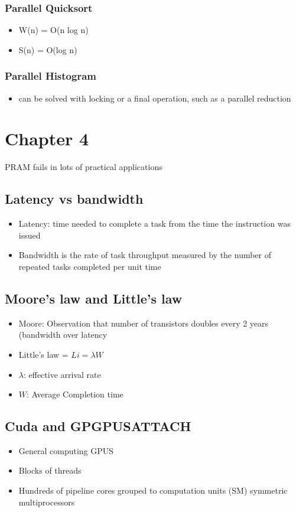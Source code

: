 \documentclass{assignments}
\begin{document}
\subsubsection*{Parallel Quicksort}
\label{sec:org1a65a16}
\begin{itemize}
\item W(n) = O(n log n)
\item S(n) = O(log n)
\end{itemize}
\subsubsection*{Parallel Histogram}
\label{sec:orgea368e5}
\begin{itemize}
\item can be solved with locking or a final operation, such as a parallel reduction
\end{itemize}
\section*{Chapter 4}
\label{sec:orgd202857}
PRAM fails in lots of practical applications
\subsection*{Latency vs bandwidth}
\label{sec:org01d8a6c}
\begin{itemize}
\item Latency: time needed to complete a task from the time the instruction was issued
\item Bandwidth is the rate of task throughput measured by the number of repeated
tasks completed per unit time
\end{itemize}
\subsection*{Moore's law and Little's law}
\label{sec:orgd836e38}
\begin{itemize}
\item Moore: Observation that number of transistors doubles every 2 years (bandwidth
over latency
\item Little's law = \(L i = \lambda W\)
\item \(\lambda\): effective arrival rate
\item \(W\): Average Completion time
\end{itemize}
\subsection*{Cuda and GPGPUS\hfill{}\textsc{ATTACH}}
\label{sec:orgcd363a2}
\begin{itemize}
\item General computing GPUS
\item Blocks of threads
\item Hundreds of pipeline cores grouped to computation units (SM) symmetric
multiprocessors
\end{itemize}
\end{document}
